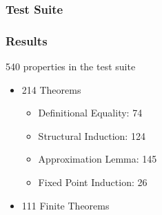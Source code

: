 \documentclass[serif,professionalfont]{beamer}
\begin{document}

\begin{frame}[fragile]
\frametitle{Test Suite}
\begin{table}[p]
\centering

\end{table}
\end{frame}



\begin{frame}
\frametitle{Results}
\label{sec-5}

540 properties in the test suite

\begin{itemize}
\item 214 Theorems
      \begin{itemize}
      \item Definitional Equality: 74
      \item Structural Induction:  124
      \item Approximation Lemma:   145
      \item Fixed Point Induction: 26
      \end{itemize}
\item 111 Finite Theorems
\end{itemize}

\end{frame}
\end{document}
